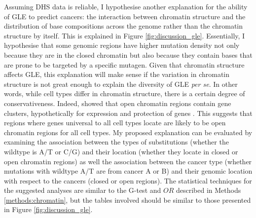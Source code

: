 Assuming DHS data is reliable, I hypothesise another explanation for the ability of GLE to predict cancers: the interaction between chromatin structure and the distribution of base compositions across the genome rather than the chromatin structure by itself. This is explained in Figure \ref{fig:discussion_gle}. Essentially, I hypothesise that some genomic regions have higher mutation density not only because they are in the closed chromatin but also because they contain bases that are prone to be targeted by a specific mutagen. Given that chromatin structure affects GLE, this explanation will make sense if the variation in chromatin structure is not great enough to explain the diversity of GLE \textit{per se}. In other words, while cell types differ in chromatin structure, there is a certain degree of conservativeness. Indeed, \citet{Gilbert2004ChromatinFibers} showed that open chromatin regions contain gene clusters, hypothetically for expression and protection of genes \citep{Gilbert2004ChromatinFibers,Gazave2005DoesDamage}. This suggests that regions where genes universal to all cell types locate are likely to be open chromatin regions for all cell types. My proposed explanation can be evaluated by examining the association between the types of substitutions (whether the wildtype is A/T or C/G) and their location (whether they locate in closed or open chromatin regions) as well the association between the cancer type (whether mutations with wildtype A/T are from cancer A or B) and their genomic location with respect to the cancers (closed or open regions). The statistical techniques for the suggested analyses are similar to the G-test and $OR$ described in Methods \ref{methods:chromatin}, but the tables involved should be similar to those presented in Figure \ref{fig:discussion_gle}.



